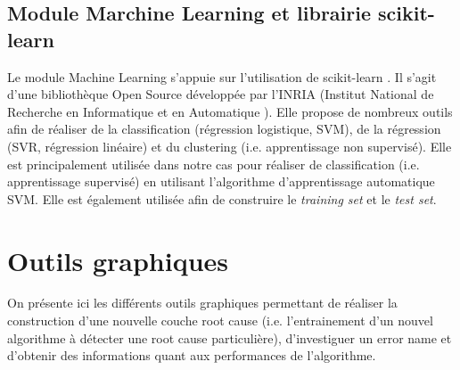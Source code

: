 \subsection{Module Marchine Learning et librairie scikit-learn}
\label{Industrialisation du produit:  API: Le module Machine Learning}
Le module Machine Learning s'appuie sur l'utilisation de scikit-learn \cite{ScikitLearn}. Il s'agit d'une bibliothèque Open Source développée par l'INRIA (Institut National de Recherche en Informatique et en Automatique \cite{INRIA}). Elle propose de nombreux outils afin de réaliser de la classification (régression logistique, SVM), de la régression (SVR, régression linéaire) et du clustering (i.e. apprentissage non supervisé). Elle est principalement utilisée dans notre cas pour réaliser de classification (i.e. apprentissage supervisé) en utilisant l'algorithme d'apprentissage automatique SVM. Elle est également utilisée afin de construire le \emph{training set} et le \emph{test set}.




\section{Outils graphiques}
\label{Industrialisation du produit: Outils graphiques}
On présente ici les différents outils graphiques permettant de réaliser la construction d'une nouvelle couche root cause (i.e. l'entrainement d'un nouvel algorithme à détecter une root cause particulière), d'investiguer un error name et d'obtenir des informations quant aux performances de l'algorithme. 

